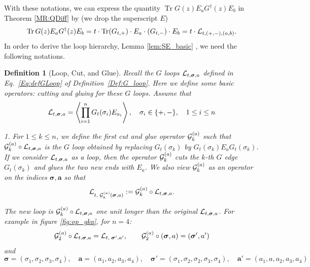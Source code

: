 \documentclass[10pt,reqno]{article}
\DeclareMathOperator{\tr}{Tr}
\theoremstyle{plain} %
\newtheorem{definition}[theorem]{Definition}
\theoremstyle{remark}
\numberwithin{equation}{section}
\begin{document}
With these notations, we can express the quantity 
$\tr G (z) E_a G^\dagger(z)  E_b$ in Theorem \ref{MR:QDiff} by 
(we drop the  superscript $E$)
$$
\tr G(z) E_a G^\dagger(z)  E_b=t \cdot \tr (G_{t,+})\cdot E_a\cdot (G_{t,-})\cdot  E_b=t\cdot {\cal L}_{t, (+,-),(a,b)}.
$$
In order to derive the loop hierarchy, Lemma \ref{lem:SE_basic} , we need  the following notations. 

 

\begin{definition}[Loop, Cut, and Glue]\label{Def:oper_loop}
Recall the $G$ loops ${\cal L}_{t, \boldsymbol{\sigma}, \textbf{a}}$ defined in Eq.~\eqref{Eq:defGLoop} of Definition~\ref{Def:G_loop}. Here we define some basic operators: cutting and gluing for these $G$ loops.  Assume that
\begin{equation}\label{taahCal}
   {\cal L}_{t, \boldsymbol{\sigma}, \textbf{a}} = \left\langle \prod_{i=1}^n G_t(\sigma_i) E_{a_i} \right\rangle, \quad \sigma_i \in \{+, -\}, \quad 1 \le i \le n 
\end{equation}
 
 \noindent 
 \emph{1.} 
 For $1 \le k \le n$, we define the first cut and glue operator ${\cal G}^{(a)}_{k}$ such that $
    {\cal G}^{(a)}_{k} \circ {\cal L}_{t, \boldsymbol{\sigma}, \textbf{a}}$  is the $G$ loop obtained by replacing $G_t(\sigma_k)$ by $G_{t}(\sigma_k) E_a G_{t}(\sigma_k)$.
  If we consider ${\cal L}_{t, \boldsymbol{\sigma}, \textbf{a}}$ as a loop, then the operator ${\cal G}^{(a)}_{k}$ cuts the $k$-th $G$ edge $G_t(\sigma_k)$ and glues the two new ends with $E_a$. 
We also view  ${\cal G}_k^{(a)}$  as an operator on the indices $\boldsymbol{\sigma},\textbf{a}$ so that 
    $$
     {\cal L}_{t, \;  {\cal G}^{(a)}_{k} (\boldsymbol{\sigma}, \textbf{a})}
     := {\cal G}^{(a)}_{k} \circ {\cal L}_{t, \boldsymbol{\sigma}, \textbf{a}}.
    $$
    
    The new loop is ${\cal G}^{(a)}_{k} \circ {\cal L}_{t, \boldsymbol{\sigma}, \textbf{a}}$  one unit longer than the original ${\cal L}_{t, \boldsymbol{\sigma}, \textbf{a}}$. For example in figure \ref{fig:op_gka}, for $n=4$:
    $$
    {\cal G}^{(a)}_{2} \circ {\cal L}_{t, \boldsymbol{\sigma}, \textbf{a}} = {\cal L}_{t, \; \boldsymbol{\sigma}', \textbf{a}'}, 
    \quad\quad 
    {\cal G}^{(a)}_{2} \circ ( \boldsymbol{\sigma}, \textbf{a}) = ( \boldsymbol{\sigma}', \textbf{a}')
    $$
    and 
    $$ \boldsymbol{\sigma}=(\sigma_1,\sigma_2,\sigma_3,\sigma_4),\quad 
   \textbf{a}= (a_1,a_2,a_3,a_4),\quad \boldsymbol{\sigma}' = (\sigma_1, \sigma_2, \sigma_2, \sigma_3, \sigma_4), \quad \textbf{a}' = (a_1, a, a_2, a_3, a_4)
    $$


\end{definition}
\end{document}
